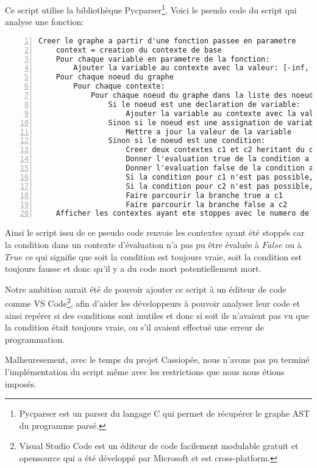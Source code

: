 Ce script utilise la bibliothèque Pycparser\footnote{Pycparser est un parser du langage C qui permet de récupérer le graphe AST du programme parsé.}.
\newpage
Voici le pseudo code du script qui analyse une fonction:
\begin{lstlisting}[numbers=left, caption={Pseudo code du script de détection d'incohérence}, captionpos=b]
    Creer le graphe a partir d'une fonction passee en parametre
    context = creation du contexte de base
    Pour chaque variable en parametre de la fonction:
        Ajouter la variable au contexte avec la valeur: [-inf, inf]
    Pour chaque noeud du graphe
        Pour chaque contexte:
            Pour chaque noeud du graphe dans la liste des noeuds du contexte:
                Si le noeud est une declaration de variable:
                    Ajouter la variable au contexte avec la valeur d'initialisation
                Sinon si le noeud est une assignation de variable:
                    Mettre a jour la valeur de la variable
                Sinon si le noeud est une condition:
                    Creer deux contextes c1 et c2 heritant du contexte actuel
                    Donner l'evaluation true de la condition a c1
                    Donner l'evaluation false de la condition a c2
                    Si la condition pour c1 n'est pas possible, stopper c1
                    Si la condition pour c2 n'est pas possible, stopper c2
                    Faire parcourir la branche true a c1
                    Faire parcourir la branche false a c2
    Afficher les contextes ayant ete stoppes avec le numero de ligne en cause
\end{lstlisting}

Ainsi le script issu de ce pseudo code renvoie les contextes ayant été stoppés car la condition dans un contexte d'évaluation n'a pas pu être évaluée à $False$ ou à $True$ ce qui signifie que soit la condition est toujours vraie, soit la condition est toujours fausse et donc qu'il y a du code mort potentiellement mort.

Notre ambition aurait été de pouvoir ajouter ce script à un éditeur de code comme VS Code\footnote{Visual Studio Code est un éditeur de code facilement modulable gratuit et opensource qui a été développé par Microsoft et est cross-platform.}, afin d'aider les développeurs à pouvoir analyser leur code et ainsi repérer si des conditions sont inutiles et donc si soit ils n'avaient pas vu que la condition était toujours vraie, ou s'il avaient effectué une erreur de programmation.

Malheuresement, avec le temps du projet Cassiopée, nous n'avons pas pu terminé l'implémentation du script même avec les restrictions que nous nous étions imposés. 

